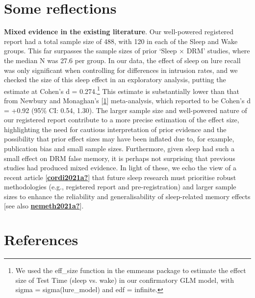 \documentclass[
]{article}
\begin{document}
\hypertarget{some-reflections}{%
\section{Some reflections}\label{some-reflections}}

\textbf{Mixed evidence in the existing literature}. Our well-powered registered report had a total sample size of 488, with 120 in each of the Sleep and Wake groups. This far surpasses the sample sizes of prior `Sleep \(\times\) DRM' studies, where the median N was 27.6 per group. In our data, the effect of sleep on lure recall was only significant when controlling for differences in intrusion rates, and we checked the size of this sleep effect in an exploratory analysis, putting the estimate at Cohen's d = 0.274.\footnote{We used the eff\_size function in the emmeans package to estimate the effect size of Test Time (sleep vs. wake) in our confirmatory GLM model, with sigma = sigma(lure\_model) and edf = infinite.} This estimate is substantially lower than that from Newbury and Monaghan's {[}\protect\hyperlink{ref-newbury2019a}{1}{]} meta-analysis, which reported to be Cohen's d = +0.92 (95\% CI: 0.54, 1.30). The larger sample size and well-powered nature of our registered report contribute to a more precise estimation of the effect size, highlighting the need for cautious interpretation of prior evidence and the possibility that prior effect sizes may have been inflated due to, for example, publication bias and small sample sizes. Furthermore, given sleep had such a small effect on DRM false memory, it is perhaps not surprising that previous studies had produced mixed evidence. In light of these, we echo the view of a recent article {[}\protect\hyperlink{ref-cordi2021a}{\textbf{cordi2021a?}}{]} that future sleep research must prioritise robust methodologies (e.g., registered report and pre-registration) and larger sample sizes to enhance the reliability and generalisability of sleep-related memory effects {[}see also \protect\hyperlink{ref-nemeth2021a}{\textbf{nemeth2021a?}}{]}.

\hypertarget{references}{%
\section*{References}\label{references}}
\end{document}

